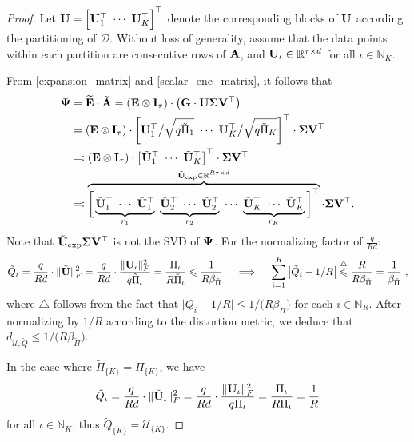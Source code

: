 \documentclass[journal,letterpaper,onecolumn,twoside,nofonttune]{IEEEtran}
\newcommand{\N}{\mathbb{N}}
\newcommand{\R}{\mathbb{R}}
\newcommand{\D}{\mathcal{D}}
\newcommand{\Uu}{\mathcal{U}}
\newcommand{\Ub}{\bold{U}}
\newcommand{\Ubt}{\tilde{\Ub}}
\newcommand{\Vb}{\bold{V}}
\newcommand{\Ab}{\bold{A}}
\newcommand{\Eb}{\bold{E}}
\newcommand{\Ebwt}{\widetilde{\bold{E}}}
\newcommand{\Gb}{\bold{G}}
\newcommand{\Ib}{\bold{I}}
\newcommand{\Qt}{\tilde{Q}}
\newcommand{\Sigb}{\bold{\Sigma}}
\newcommand{\Abt}{\tilde{\Ab}}
\newcommand{\Pit}{\tilde{\Pi}}
\newcommand{\PsiB}{\bold{\Psi}}
\newcommand{\SVD}{\mathrm{SVD}}
\begin{document}
\begin{proof}
Let $\Ub=\Big[\Ub_1^\top \ \cdots \ \Ub_K^\top\Big]^\top$ denote the corresponding blocks of $\Ub$ according the partitioning of $\D$. Without loss of generality, assume that the data points within each partition are consecutive rows of $\Ab$, and $\Ub_\iota\in\R^{\tau\times d}$ for all $\iota\in\N_K$.

From \eqref{expansion_matrix} and \eqref{scalar_enc_matrix}, it follows that
\begin{align*}
  \PsiB &= \Ebwt\cdot\Abt = \left(\Eb\otimes\Ib_\tau\right)\cdot\left(\Gb\cdot\Ub\Sigb\Vb^\top\right) \\
  &= \left(\Eb\otimes\Ib_\tau\right) \cdot \left[\Ub_1^\top\big/\sqrt{q\Pit_1} \ \cdots \ \Ub_K^\top\big/\sqrt{q\Pit_K}\right]^\top \cdot \Sigb\Vb^\top \\
  &\eqqcolon \left(\Eb\otimes\Ib_\tau\right) \cdot \left[\Ubt_1^\top \ \cdots \ \Ubt_K^\top\right]^\top \cdot \Sigb\Vb^\top \\
  &\eqqcolon \overbrace{\bigg[ \underbrace{\Ubt_1^\top \ \cdots \ \Ubt_1^\top}_{r_1} \ \underbrace{\Ubt_2^\top \ \cdots \ \Ubt_2^\top}_{r_2} \ \cdots \ \underbrace{\Ubt_K^\top \ \cdots \ \Ubt_K^\top}_{r_K} \bigg]^\top}^{\Ubt_{\mathrm{exp}}\in\R^{R\tau\times d}} \cdot \Sigb\Vb^\top .
\end{align*}
Note that $\Ubt_{\mathrm{exp}}\Sigb\Vb^\top$ is not the $\SVD$ of $\PsiB$. For the normalizing factor of $\frac{q}{Rd}$:
$$ \Qt_\iota = \frac{q}{Rd}\cdot\|\Ubt\|_F^2 = \frac{q}{Rd}\cdot\frac{\|\Ub_\iota\|_F^2}{q\Pit_\iota} = \frac{\Pi_\iota}{R\Pit_\iota} \leqslant \frac{1}{R\beta_{\Pit}} \quad \implies \quad \sum_{i=1}^R\big|\Qt_i-1/R\big|\overset{\triangle}{\leqslant} \frac{R}{R\beta_{\Pit}} = \frac{1}{\beta_{\Pit}}\ , $$
where $\triangle$ follows from the fact that $\big|\Qt_i-1/R\big|\leqslant1\big/\big(R\beta_{\Pit}\big)$ for each $i\in\N_R$. After normalizing by $1/R$ according to the distortion metric, we deduce that $d_{\Uu,\Qt}\leqslant1\big/\big(R\beta_{\Pit}\big)$.

In the case where $\Pit_{\{K\}}=\Pi_{\{K\}}$, we have
$$ \Qt_\iota = \frac{q}{Rd}\cdot\|\Ubt_\iota\|_F^2 = \frac{q}{Rd}\cdot\frac{\|\Ub_\iota\|_F^2}{q\Pi_\iota} = \frac{\Pi_\iota}{R\Pi_\iota} = \frac{1}{R} $$
for all $\iota\in\N_K$, thus $\Qt_{\{K\}}=\Uu_{\{K\}}$.
\end{proof}
\end{document}
